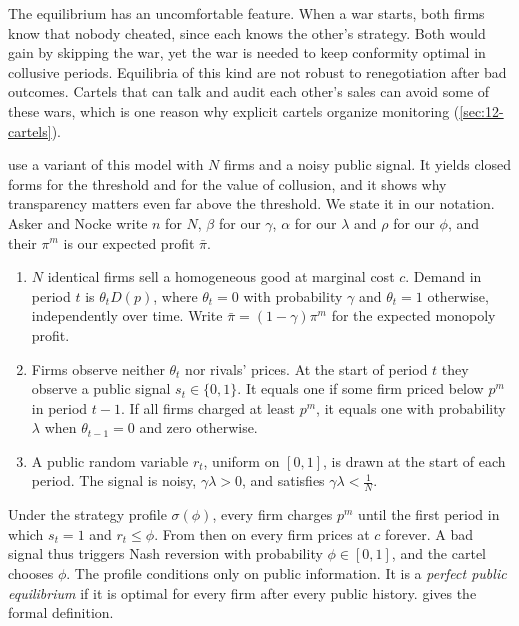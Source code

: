 The equilibrium has an uncomfortable feature. When a war starts, both firms know that nobody cheated, since each
knows the other's strategy. Both would gain by skipping the war, yet the war is needed to keep conformity optimal in
collusive periods. Equilibria of this kind are not robust to renegotiation after bad outcomes. Cartels that can talk
and audit each other's sales can avoid some of these wars, which is one reason why explicit cartels organize
monitoring (\cref{sec:12-cartels}).

 use a variant of this model with $N$ firms and a noisy public signal. It yields
closed forms for the threshold and for the value of collusion, and it shows why transparency matters even far above
the threshold. We state it in our notation. Asker and Nocke write $n$ for $N$, $\beta$ for our $\gamma$, $\alpha$ for
our $\lambda$ and $\rho$ for our $\phi$, and their $\pi^m$ is our expected profit $\bar\pi$.

\begin{assumption}\label{asm:12-an}
\leavevmode
\begin{enumerate}[label=(\roman*)]
\item $N$ identical firms sell a homogeneous good at marginal cost $c$. Demand in period $t$ is $\theta_tD(p)$, where
$\theta_t = 0$ with probability $\gamma$ and $\theta_t = 1$ otherwise, independently over time. Write
$\bar\pi = (1 - \gamma)\pi^m$ for the expected monopoly profit.
\item Firms observe neither $\theta_t$ nor rivals' prices. At the start of period $t$ they observe a public signal
$s_t \in \{0, 1\}$. It equals one if some firm priced below $p^m$ in period $t - 1$. If all firms charged at least
$p^m$, it equals one with probability $\lambda$ when $\theta_{t-1} = 0$ and zero otherwise.
\item A public random variable $r_t$, uniform on $[0, 1]$, is drawn at the start of each period. The signal is noisy,
$\gamma\lambda > 0$, and satisfies $\gamma\lambda < \frac{1}{N}$.
\end{enumerate}
\end{assumption}

Under the strategy profile $\sigma(\phi)$, every firm charges $p^m$ until the first period in which $s_t = 1$ and
$r_t \le \phi$. From then on every firm prices at $c$ forever. A bad signal thus triggers Nash reversion with
probability $\phi \in [0, 1]$, and the cartel chooses $\phi$. The profile conditions only on public information. It is
a \emph{perfect public equilibrium} if it is optimal for every firm after every public history.
 gives the formal definition.

